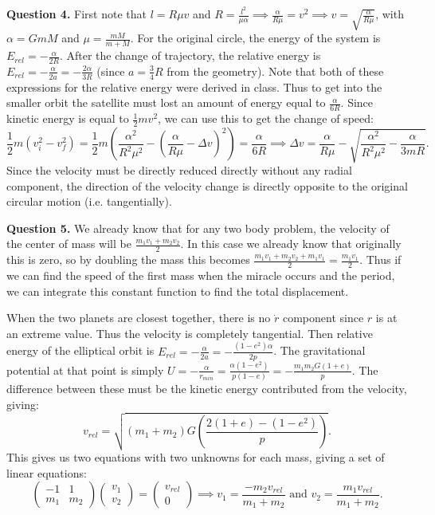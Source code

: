 \documentclass[letterpaper, reqno,11pt]{article}
\begin{document}
{\noindent\bf Question 4.} First note that $l=R\mu v$ and $R=\frac{l^2}{\mu\alpha}\implies \frac{\alpha}{R\mu}=v^{2}\implies v=\sqrt{\frac{\alpha}{R\mu}} $, with $\alpha=GmM$ and $\mu=\frac{mM}{m+M}$. For the original circle, the energy of the system is $E_{rel}=-\frac{\alpha}{2R}$. After the change of trajectory, the relative energy is $E_{rel}=-\frac{\alpha}{2a}=-\frac{2\alpha}{3R}$ (since $a=\frac{3}{4}R$ from the geometry). Note that both of these expressions for the relative energy were derived in class. Thus to get into the smaller orbit the satellite must lost an amount of energy equal to $\frac{\alpha}{6R}$. Since kinetic energy is equal to $\frac{1}{2}m v^2$, we can use this to get the change of speed: 
\[
\frac{1}{2}m (v_i^2-v_f^2)=\frac{1}{2}m(\frac{\alpha^2}{R^2\mu^2}-\left( \frac{\alpha}{R\mu}-\Delta v \right) ^2)=\frac{\alpha}{6R}\implies \Delta v=\frac{\alpha}{R\mu}-\sqrt{\frac{\alpha^2}{R^2\mu^2}-\frac{\alpha}{3mR}} 
.\]
Since the velocity must be directly reduced directly without any radial component, the direction of the velocity change is directly opposite to the original circular motion (i.e. tangentially). 

{\noindent\bf Question 5.} We already know that for any two body problem, the velocity of the center of mass will be $\frac{m_1v_1+m_2v_2}{ 2}$. In this case we already know that originally this is zero, so by doubling the mass this becomes $\frac{m_1v_1+m_2v_2+m_1v_1}{2}=\frac{m_1v_1}{2}$. Thus if we can find the speed of the first mass when the miracle occurs and the period, we can integrate this constant function to find the total displacement. 

When the two planets are closest together, there is no $\dot r$ component since $r$ is at an extreme value. Thus the velocity is completely tangential. Then relative energy of the elliptical orbit is $E_{rel}=-\frac{\alpha}{2a}=-\frac{(1-e^2)\alpha}{2p}$. The gravitational potential at that point is simply $U=-\frac{\alpha}{r_{min}}=\frac{\alpha(1-e^2)}{p(1-e)}=-\frac{m_1m_2G(1+e)}{p}$. The difference between these must be the kinetic energy contributed from the velocity, giving: 
\[
v_{rel}=\sqrt{(m_1+m_2)G\left( \frac{2(1+e)-(1-e^2)}{p} \right) } 
.\]
This gives us two equations with two unknowns for each mass, giving a set of linear equations:
\[
    \begin{pmatrix} -1&1\\m_1&m_2 \end{pmatrix} \begin{pmatrix} v_1\\v_2 \end{pmatrix}=\begin{pmatrix} v_{rel}\\0 \end{pmatrix}\implies v_1=\frac{-m_2v_{rel}}{m_1+m_2}\text{ and }v_2=\frac{m_1v_{rel}}{m_1+m_2}
.\]
\end{document}
